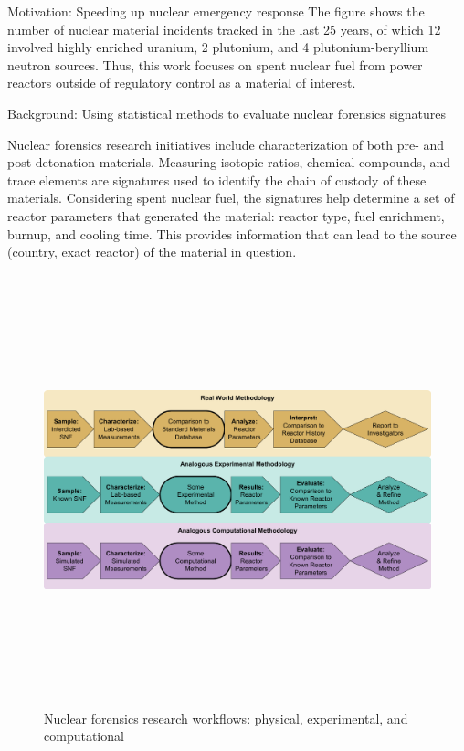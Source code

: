 \documentclass{beamer}
\begin{document}
\begin{frame}[t]{}
\begin{columns}
\begin{column}[T]{0.27\textwidth}
\begin{block}{Motivation: Speeding up nuclear emergency response}
The figure shows the number of nuclear material incidents tracked in the last
25 years, of which 12 involved highly enriched uranium, 2 plutonium, and 4
plutonium-beryllium neutron sources.  Thus, this work focuses on spent nuclear
fuel from power reactors outside of regulatory control as a material of
interest. 

\end{block}

\begin{block}{Background: Using statistical methods to evaluate nuclear forensics signatures}

Nuclear forensics research initiatives include characterization of both pre-
and post-detonation materials. Measuring isotopic ratios, chemical compounds,
and trace elements are signatures used to identify the chain of custody of
these materials. Considering spent nuclear fuel, the signatures help determine
a set of reactor parameters that generated the material: reactor type, fuel
enrichment, burnup, and cooling time.  This provides information that can lead
to the source (country, exact reactor) of the material in question.

\begin{figure}
  \includegraphics[height=12.5cm]{figures/researchworkflows.png}
  \caption{Nuclear forensics research workflows: physical, experimental, and computational}
\end{figure}


\end{block}
\end{column}
\end{columns}
\end{frame}
\end{document}
